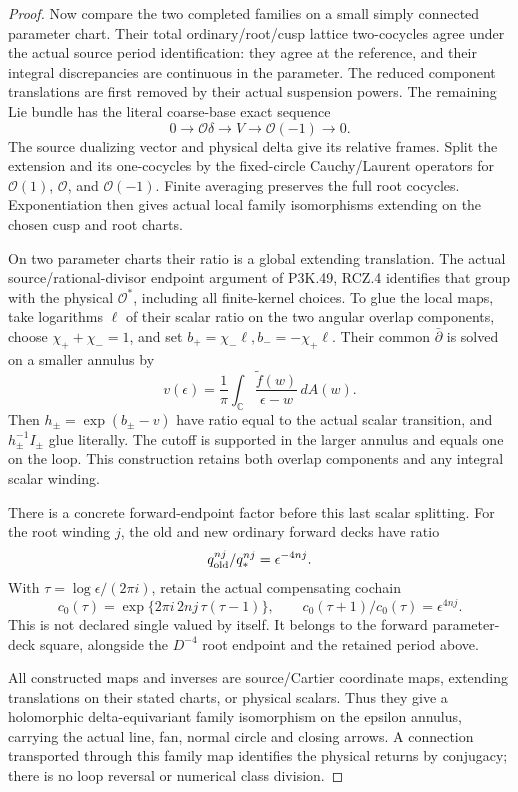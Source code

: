 \begin{proof}
Now compare the two completed families on a
small simply connected parameter chart.
Their total ordinary/root/cusp lattice
two-cocycles agree under the actual source
period identification: they agree at the
reference, and their integral discrepancies
are continuous in the parameter. The reduced
component translations are first removed by
their actual suspension powers. The remaining
Lie bundle has the literal coarse-base exact
sequence
\[
     0\longrightarrow\mathcal O\delta
       \longrightarrow V\longrightarrow\mathcal O(-1)
       \longrightarrow0 .
\]
The source dualizing vector and physical delta
give its relative frames. Split the extension
and its one-cocycles by the fixed-circle
Cauchy/Laurent operators for \(\mathcal O(1)\),
\(\mathcal O\), and \(\mathcal O(-1)\).
Finite averaging preserves the full root
cocycles. Exponentiation then gives actual
local family isomorphisms extending on the
chosen cusp and root charts.

On two parameter charts their ratio is a
global extending translation. The actual
source/rational-divisor endpoint argument
of P3K.49, RCZ.4 identifies that group with the
physical \(\mathcal O^*\), including all
finite-kernel choices. To glue the local
maps, take logarithms \(\ell\) of their
scalar ratio on the two angular overlap
components, choose \(\chi_++\chi_-=1\),
and set \(b_+=\chi_-\ell,b_-=-\chi_+\ell\).
Their common \(\bar\partial\) is solved on
a smaller annulus by
\[
 v(\epsilon)=\frac1\pi\int_{\mathbb C}
       \frac{\widetilde f(w)}{\epsilon-w}\,dA(w).
\]
Then \(h_\pm=\exp(b_\pm-v)\) have ratio
equal to the actual scalar transition,
and \(h_\pm^{-1}I_\pm\) glue literally.
The cutoff is supported in the larger
annulus and equals one on the loop.
This construction retains both overlap
components and any integral scalar winding.

There is a concrete forward-endpoint
factor before this last scalar splitting.
For the root winding \(j\), the old and
new ordinary forward decks have ratio
\[
      q_{\rm old}^{nj}/q_*^{nj}
                         =\epsilon^{-4nj}.
\]
With \(\tau=\log\epsilon/(2\pi i)\), retain
the actual compensating cochain
\[
 c_0(\tau)=\exp\{2\pi i\,2nj\,\tau(\tau-1)\},
 \qquad
 c_0(\tau+1)/c_0(\tau)=\epsilon^{4nj}.                 \tag{P3K.57.IF.33}
\]
This is not declared single valued by
itself. It belongs to the forward
parameter-deck square, alongside the
\(D^{-4}\) root endpoint and the
retained period above.

All constructed maps and inverses are
source/Cartier coordinate maps,
extending translations on their stated
charts, or physical scalars. Thus they
give a holomorphic delta-equivariant
family isomorphism on the epsilon
annulus, carrying the actual line,
fan, normal circle and closing arrows.
A connection transported through
this family map identifies the physical
returns by conjugacy; there is no
loop reversal or numerical class division.


\end{proof}
